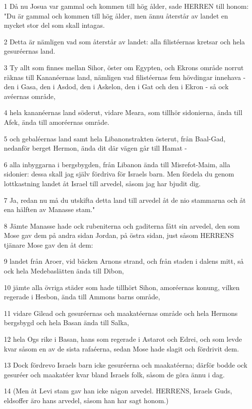 \par 1 Då nu Josua var gammal och kommen till hög ålder, sade HERREN till honom: "Du är gammal och kommen till hög ålder, men ännu återstår av landet en mycket stor del som skall intagas.
\par 2 Detta är nämligen vad som återstår av landet: alla filistéernas kretsar och hela gesuréernas land.
\par 3 Ty allt som finnes mellan Sihor, öster om Egypten, och Ekrons område norrut räknas till Kananéernas land, nämligen vad filistéernas fem hövdingar innehava - den i Gasa, den i Asdod, den i Askelon, den i Gat och den i Ekron - så ock avéernas område,
\par 4 hela kananéernas land söderut, vidare Meara, som tillhör sidonierna, ända till Afek, ända till amoréernas område.
\par 5 och gebaléernas land samt hela Libanonstrakten österut, från Baal-Gad, nedanför berget Hermon, ända dit där vägen går till Hamat -
\par 6 alla inbyggarna i bergsbygden, från Libanon ända till Misrefot-Maim, alla sidonier: dessa skall jag själv fördriva för Israels barn. Men fördela du genom lottkastning landet åt Israel till arvedel, såsom jag har bjudit dig.
\par 7 Ja, redan nu må du utskifta detta land till arvedel åt de nio stammarna och åt ena hälften av Manasse stam."
\par 8 Jämte Manasse hade ock rubeniterna och gaditerna fått sin arvedel, den som Mose gav dem på andra sidan Jordan, på östra sidan, just såsom HERRENS tjänare Mose gav den åt dem:
\par 9 landet från Aroer, vid bäcken Arnons strand, och från staden i dalens mitt, så ock hela Medebaslätten ända till Dibon,
\par 10 jämte alla övriga städer som hade tillhört Sihon, amoréernas konung, vilken regerade i Hesbon, ända till Ammons barns område,
\par 11 vidare Gilead och gesuréernas och maakatéernas område och hela Hermons bergsbygd och hela Basan ända till Salka,
\par 12 hela Ogs rike i Basan, hans som regerade i Astarot och Edrei, och som levde kvar såsom en av de sista rafaéerna, sedan Mose hade slagit och fördrivit dem.
\par 13 Dock fördrevo Israels barn icke gesuréerna och maakatéerna; därför bodde ock gesuréer och maakatéer kvar bland Israels folk, såsom de göra ännu i dag.
\par 14 (Men åt Levi stam gav han icke någon arvedel. HERRENS, Israels Guds, eldsoffer äro hans arvedel, såsom han har sagt honom.)
